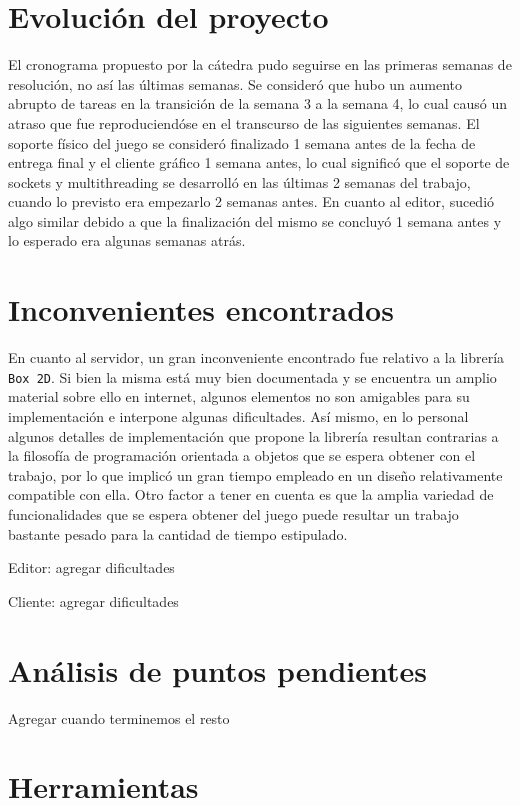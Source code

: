 \documentclass[a4paper]{article}
\begin{document}
\section{Evolución del proyecto}
El cronograma propuesto por la cátedra pudo seguirse en las primeras semanas de resolución, no así las últimas semanas. Se consideró que hubo un aumento abrupto de tareas en la transición de la semana 3 a la semana 4, lo cual causó un atraso que fue reproduciendóse en el transcurso de las siguientes semanas. El soporte físico del juego se consideró finalizado 1 semana antes de la fecha de entrega final y el cliente gráfico 1 semana antes, lo cual significó que el soporte de sockets y multithreading se desarrolló en las últimas 2 semanas del trabajo, cuando lo previsto era empezarlo 2 semanas antes. En cuanto al editor, sucedió algo similar debido a que la finalización del mismo se concluyó 1 semana antes y lo esperado era algunas semanas atrás. 

\section{Inconvenientes encontrados}
En cuanto al servidor, un gran inconveniente encontrado fue relativo a la librería \texttt{Box 2D}. Si bien la misma está muy bien documentada y se encuentra un amplio material sobre ello en internet, algunos elementos no son amigables para su implementación e interpone algunas dificultades. Así mismo, en lo personal algunos detalles de implementación que propone la librería resultan contrarias a la filosofía de programación orientada a objetos que se espera obtener con el trabajo, por lo que implicó un gran tiempo empleado en un diseño relativamente compatible con ella. Otro factor a tener en cuenta es que la amplia variedad de funcionalidades que se espera obtener del juego puede resultar un trabajo bastante pesado para la cantidad de tiempo estipulado.

Editor: agregar dificultades

Cliente: agregar dificultades

\section{Análisis de puntos pendientes}

Agregar cuando terminemos el resto

\section{Herramientas}
\end{document}
